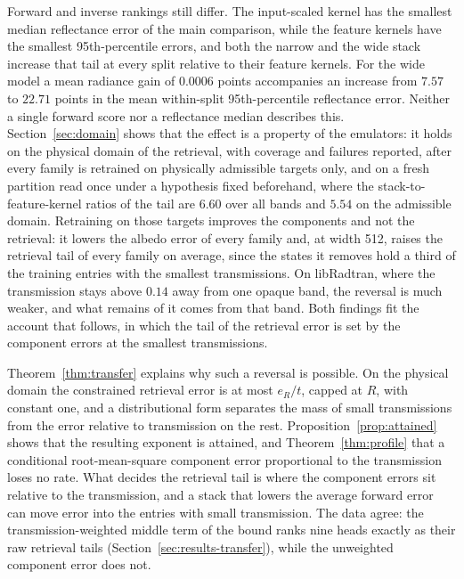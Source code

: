 \documentclass[11pt]{article}
\newcommand{\1}{\mathbf{1}}
\begin{document}
Forward and inverse rankings still differ. The input-scaled kernel has the smallest median
reflectance error of the main comparison, while the feature kernels have the smallest
95th-percentile errors, and both the narrow and the wide stack increase that tail at every split
relative to their feature kernels. For the wide model a mean radiance gain of $0.0006$ points
accompanies an increase from $7.57$ to $22.71$ points in the mean within-split 95th-percentile
reflectance error. Neither a single forward score nor a reflectance median describes this.
Section~\ref{sec:domain} shows that the effect is a property of the emulators: it holds on the
physical domain of the retrieval, with coverage and failures reported,
after every family is retrained on physically admissible targets only, and on a fresh partition read once under a hypothesis fixed beforehand, where
the stack-to-feature-kernel ratios of the tail are $6.60$ over all bands and $5.54$ on the
admissible domain. Retraining on those targets improves the components and not the retrieval: it lowers the albedo error of every family and, at width 512, raises the retrieval tail of every family on average, since the states it removes hold a third of the training entries with the smallest transmissions. On libRadtran, where the transmission stays above $0.14$ away from one opaque band, the reversal is much weaker, and what remains of it comes from that band. Both findings fit the account that follows, in which the tail of the retrieval error is set by the component errors at the smallest transmissions.

Theorem~\ref{thm:transfer} explains why such a reversal is possible. On the physical domain the
constrained retrieval error is at most $e_R/t$, capped at $R$, with constant one, and a
distributional form separates the mass of small transmissions from the error relative to
transmission on the rest. Proposition~\ref{prop:attained} shows that the resulting exponent is
attained, and Theorem~\ref{thm:profile} that a conditional root-mean-square component error
proportional to the transmission loses no rate. What decides the retrieval tail is where the
component errors sit relative to the transmission, and a stack that lowers the average forward
error can move error into the entries with small transmission. The data agree: the
transmission-weighted middle term of the bound ranks nine heads exactly as their raw retrieval
tails (Section~\ref{sec:results-transfer}), while the unweighted component error does not.
\end{document}
